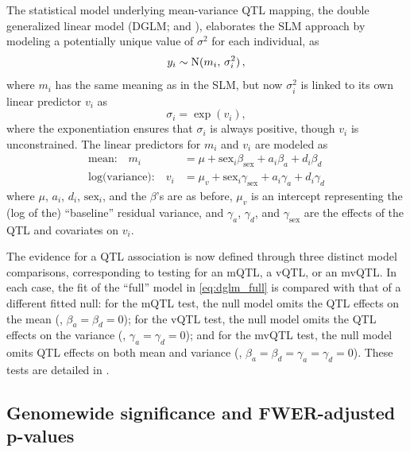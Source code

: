    The statistical model underlying mean-variance QTL mapping, the double generalized linear model (DGLM; \citealt{Smyth1989} and \citealt{Ronnegard2011a}), elaborates the SLM approach by modeling a potentially unique value of $\sigma^2$ for each individual, as
    \[
        y_i \sim \mathrm{N}(m_i, \,\sigma_i^2)\,,
    \]
    where $m_i$ has the same meaning as in the SLM, but now $\sigma^2_i$ is linked to its own linear predictor $v_i$ as
    \[
        \sigma_i = \exp(v_i),
    \]
    where the exponentiation ensures that $\sigma_i$ is always positive, though $v_i$ is unconstrained.
    The linear predictors for $m_i$ and $v_i$ are modeled as
    \begin{equation}\label{eq:dglm_full}
    \begin{aligned}
        \text{mean:~~~} m_i &= \mu + \text{sex}_i\beta_\text{sex} + a_i\beta_a + d_i\beta_d\\
        \text{log(variance):~~~} v_i &=  \mu_v + \text{sex}_i\gamma_\text{sex} + a_i\gamma_a + d_i\gamma_d
    \end{aligned}
    \end{equation}
    where $\mu$, $a_i$, $d_i$, $\text{sex}_i$, and the $\beta$'s are as before,
    $\mu_v$ is an intercept representing the (log of the) ``baseline'' residual variance, and $\gamma_a$, $\gamma_d$, and $\gamma_\text{sex}$ are the effects of the QTL and covariates on $v_i$.

    The evidence for a QTL association is now defined through three distinct model comparisons, corresponding to testing for an mQTL, a vQTL, or an mvQTL.
    In each case, the fit of the ``full'' model in \autoref{eq:dglm_full} is compared with that of a different fitted null: for the mQTL test, the null model omits the QTL effects on the mean (\ie, $\beta_a=\beta_d=0$); for the vQTL test, the null model omits the QTL effects on the variance (\ie, $\gamma_a=\gamma_d=0$); and for the mvQTL test, the null model omits QTL effects on both mean and variance (\ie, $\beta_a=\beta_d=\gamma_a=\gamma_d=0$).
    These tests are detailed in \CortyMethodsPaper.


\subsection{Genomewide significance and FWER-adjusted p-values}

